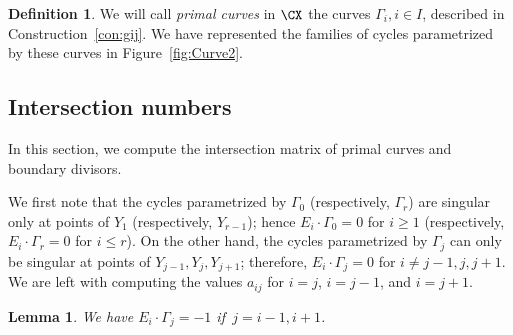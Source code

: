 \documentclass[11pt]{amsart}
\numberwithin{equation}{section}
\newtheorem{lemma}[theorem]{Lemma}
\theoremstyle{definition}
\newtheorem{definition}[theorem]{Definition}
\theoremstyle{remark}
\begin{document}
\begin{definition}\label{def:curves}
We will call {\em primal curves} in $\CX$ the curves $\Gamma_i, i \in I$, described in Construction~\ref{con:gij}. We have represented the families of cycles parametrized by these curves in Figure~\ref{fig:Curve2}.
\end{definition}

\subsection{Intersection numbers}

In this section, we compute the intersection matrix of primal curves and boundary divisors. 

We first note that the cycles parametrized by $\Gamma_0$ (respectively, $\Gamma_r$) are singular only at points of $Y_1$ (respectively, $Y_{r-1}$); hence $ E_i\cdot\Gamma_{0}=0$ for $i\geq 1$ (respectively, $E_i\cdot\Gamma_{r}=0$ for $i\leq r$). On the other hand, the cycles parametrized by $\Gamma_j$ can only be singular at points of $Y_{j-1},Y_j,Y_{j+1}$; therefore, $E_i\cdot \Gamma_j=0$ for $i\neq j-1,j,j+1$.  We are left with computing the values $a_{ij}$ for $i=j$, $i=j-1$, and $i=j+1$.

\begin{lemma}\label{rem:intnumbers2}
We have $E_i\cdot\Gamma_j=-1$ if\, $j=i-1,i+1$.
\end{lemma}
\end{document}
